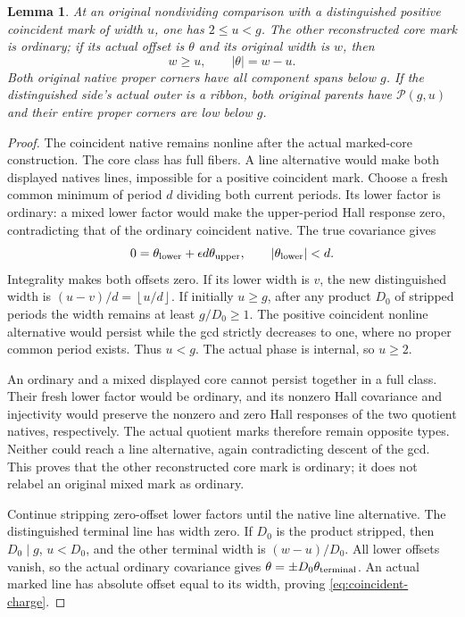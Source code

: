 \documentclass[11pt,a4paper]{amsart}
\numberwithin{equation}{section}
\theoremstyle{plain}
\newtheorem{lemma}[theorem]{Lemma}
\theoremstyle{definition}
\newcommand{\floor}[1]{\left\lfloor#1\right\rfloor}
\begin{document}
\begin{lemma}\label{lem:coincident-width}
At an original nondividing comparison with a distinguished positive
coincident mark of width \(u\), one has \(2\le u<g\).
The other reconstructed core mark is ordinary; if its actual offset is
\(\theta\) and its original width is \(w\), then
\begin{equation}\label{eq:coincident-charge}
 w\ge u,\qquad |\theta|=w-u.
\end{equation}
Both original native proper corners have all component spans below \(g\).
If the distinguished side's actual outer is a ribbon, both original
parents have \(\mathcal P(g,u)\) and their entire proper corners are low below \(g\).
\end{lemma}
\begin{proof}
The coincident native remains nonline after the actual marked-core
construction.  The core class has full fibers.  A line alternative would
make both displayed natives lines, impossible for a positive coincident
mark.  Choose a fresh common minimum of period \(d\) dividing both current
periods.  Its lower factor is ordinary: a mixed lower factor would make the
upper-period Hall response zero, contradicting that of the ordinary
coincident native.  The true covariance gives
\[
 0=\theta_{\rm lower}+\epsilon d\theta_{\rm upper},\qquad
 |\theta_{\rm lower}|<d.
\]
Integrality makes both offsets zero.  If its lower width is \(v\), the
new distinguished width is \((u-v)/d=\floor{u/d}\).
If initially \(u\ge g\), after any product \(D_0\) of stripped periods the
width remains at least \(g/D_0\ge1\).  The positive coincident nonline
alternative would persist while the gcd strictly decreases to one,
where no proper common period exists.  Thus \(u<g\).  The actual phase is
internal, so \(u\ge2\).

An ordinary and a mixed displayed core cannot persist together in a full
class.  Their fresh lower factor would be ordinary, and its nonzero Hall
covariance and injectivity would preserve the nonzero and zero Hall
responses of the two quotient natives, respectively.  The actual quotient
marks therefore remain opposite types.  Neither could reach a line
alternative, again contradicting descent of the gcd.  This proves that
the other reconstructed core mark is ordinary; it does not relabel an
original mixed mark as ordinary.

Continue stripping zero-offset lower factors until the native line
alternative.  The distinguished terminal line has width zero.  If \(D_0\)
is the product stripped, then \(D_0\mid g\), \(u<D_0\), and the other terminal
width is \((w-u)/D_0\).  All lower offsets vanish, so the actual ordinary
covariance gives \(\theta=\pm D_0\theta_{\rm terminal}\).  An actual marked
line has absolute offset equal to its width, proving
\eqref{eq:coincident-charge}.


\end{proof}
\end{document}
